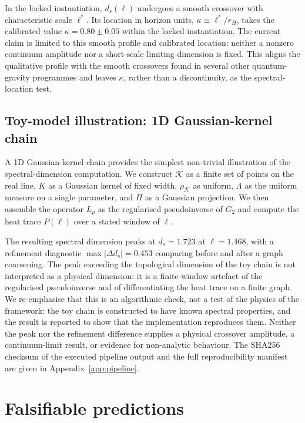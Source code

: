 ﻿\documentclass[12pt,a4paper]{article}
\theoremstyle{definition}
\begin{document}
In the locked instantiation, $d_s(\ell)$ undergoes a smooth crossover with characteristic scale $\ell^\ast$. Its location in horizon units, $\kappa \equiv \ell^\ast/r_H$, takes the calibrated value $\kappa = 0.80 \pm 0.05$ within the locked instantiation. The current claim is limited to this smooth profile and calibrated location: neither a nonzero continuum amplitude nor a short-scale limiting dimension is fixed. This aligns the qualitative profile with the smooth crossovers found in several other quantum-gravity programmes and leaves $\kappa$, rather than a discontinuity, as the spectral-location test.

\subsection{Toy-model illustration: 1D Gaussian-kernel chain}
\label{sec:toy_illustration}

A 1D Gaussian-kernel chain provides the simplest non-trivial illustration of the spectral-dimension computation. We construct $\mathcal{K}$ as a finite set of points on the real line, $K$ as a Gaussian kernel of fixed width, $\rho_{\mathcal{K}}$ as uniform, $\Lambda$ as the uniform measure on a single parameter, and $\Pi$ as a Gaussian projection. We then assemble the operator $L_\rho$ as the regularised pseudoinverse of $G_2$ and compute the heat trace $P(\ell)$ over a stated window of $\ell$.

The resulting spectral dimension peaks at $d_s = 1.723$ at $\ell = 1.468$, with a refinement diagnostic $\max|\Delta d_s| = 0.453$ comparing before and after a graph coarsening. The peak exceeding the topological dimension of the toy chain is not interpreted as a physical dimension: it is a finite-window artefact of the regularised pseudoinverse and of differentiating the heat trace on a finite graph. We re-emphasise that this is an algorithmic check, not a test of the physics of the framework: the toy chain is constructed to have known spectral properties, and the result is reported to show that the implementation reproduces them. Neither the peak nor the refinement difference supplies a physical crossover amplitude, a continuum-limit result, or evidence for non-analytic behaviour. The SHA256 checksum of the executed pipeline output and the full reproducibility manifest are given in Appendix~\ref{app:pipeline}.

\section{Falsifiable predictions}
\label{sec:predictions}
\end{document}
